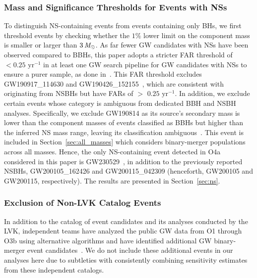\subsubsection{Mass and Significance Thresholds for Events with \acp{NS}}
To distinguish \ac{NS}-containing events from events containing only \acp{BH}, 
we first threshold events by checking whether the $1\%$ lower limit on the component 
mass is smaller or larger than $3\,\mathit{M_\odot}$.
As far fewer \ac{GW} candidates with \acp{NS} have been observed compared to 
\acp{BBH}, this paper adopts a stricter \ac{FAR} threshold of $<0.25$ $\text{yr}^{-1}$ 
in at least one \ac{GW} search pipeline for \ac{GW} candidates with \acp{NS} 
to ensure a purer sample, as done in~\citet{KAGRA:2021duu}. 
This \ac{FAR} threshold excludes GW190917\_114630 and 
GW190426\_152155~\citep{LIGOScientific:2021usb}, 
which are consistent with originating from \acp{NSBH} but have \acp{FAR} of 
$>$ $0.25$ $\text{yr}^{-1}$. 
In addition, we exclude certain events whose category is ambiguous from 
dedicated \ac{BBH} and \ac{NSBH} analyses.
Specifically, we exclude GW190814 as its 
source's secondary mass is lower than the component masses of events classified 
as \acp{BBH} but higher than the inferred \ac{NS} mass range, leaving its 
classification 
ambiguous~\citep{LIGOScientific:2020zkf, Essick:2021vlx, KAGRA:2021duu}.
This event is included in Section~\ref{sec:all_masses} which considers binary-merger 
populations across all masses. 
Hence, the only \ac{NS}-containing event detected in \ac{O4a} considered in
this paper is GW230529~\citep{LIGOScientific:2024elc}, in addition to the  
previously reported \acp{NSBH}, GW200105\_162426 and GW200115\_042309 
(henceforth, GW200105 and GW200115, respectively).
The results are presented in Section~\ref{sec:ns}.

\subsubsection{Exclusion of Non-LVK Catalog Events}
In addition to the catalog of event candidates and its analyses conducted by the 
\ac{LVK}, independent teams have analyzed the public \ac{GW} data from \ac{O1} 
through \ac{O3b} using alternative algorithms and have identified additional 
\ac{GW} binary-merger event 
candidates~\citep{Venumadhav:2019tad, Venumadhav:2019lyq, Olsen:2022pin, Mehta:2023zlk, Wadekar:2023gea, Zackay:2019tzo, Nitz:2018imz, Nitz:2020oeq, Nitz:2021uxj, Nitz:2021zwj, Kumar:2024bfe, Mishra:2024zzs, Koloniari:2024kww}. 
We do not include these additional events in our analyses here due to subtleties 
with consistently combining sensitivity estimates from these independent catalogs.


